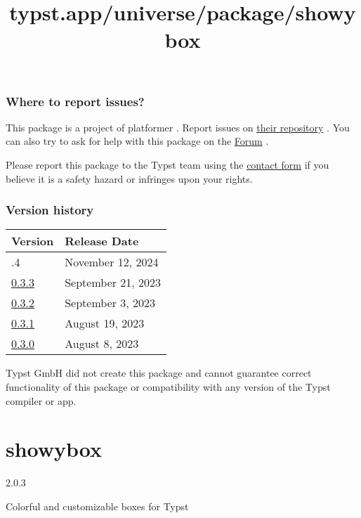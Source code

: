 \subsubsection{Where to report issues?}\label{where-to-report-issues}

This package is a project of platformer . Report issues on
\href{https://github.com/platformer/typst-algorithms}{their repository}
. You can also try to ask for help with this package on the
\href{https://forum.typst.app}{Forum} .

Please report this package to the Typst team using the
\href{https://typst.app/contact}{contact form} if you believe it is a
safety hazard or infringes upon your rights.

\label{versions}
\subsubsection{Version history}\label{version-history}

\begin{longtable}[]{@{}ll@{}}
\toprule\noalign{}
Version & Release Date \\
\midrule\noalign{}
\endhead
\bottomrule\noalign{}
\endlastfoot
0.3.4 & November 12, 2024 \\
\href{https://typst.app/universe/package/algo/0.3.3/}{0.3.3} & September
21, 2023 \\
\href{https://typst.app/universe/package/algo/0.3.2/}{0.3.2} & September
3, 2023 \\
\href{https://typst.app/universe/package/algo/0.3.1/}{0.3.1} & August
19, 2023 \\
\href{https://typst.app/universe/package/algo/0.3.0/}{0.3.0} & August 8,
2023 \\
\end{longtable}

Typst GmbH did not create this package and cannot guarantee correct
functionality of this package or compatibility with any version of the
Typst compiler or app.


\title{typst.app/universe/package/showybox}

\label{banner}
\section{showybox}\label{showybox}

{ 2.0.3 }

Colorful and customizable boxes for Typst

